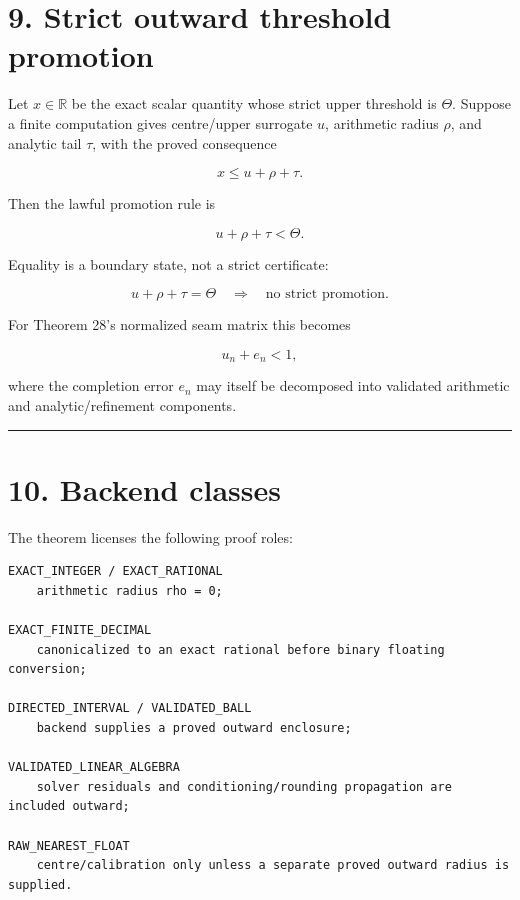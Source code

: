 \hypertarget{strict-outward-threshold-promotion}{%
\section{9. Strict outward threshold promotion}\label{strict-outward-threshold-promotion}}

Let \(x\in\mathbb R\) be the exact scalar quantity whose strict upper threshold
is \(\Theta\). Suppose a finite computation gives centre/upper surrogate \(u\),
arithmetic radius \(\rho\), and analytic tail \(\tau\), with the proved
consequence

\[
x\le u+\rho+\tau.
\tag{9.1}
\]

Then the lawful promotion rule is

\[
\boxed{u+\rho+\tau<\Theta.}
\tag{9.2}
\]

Equality is a boundary state, not a strict certificate:

\[
u+\rho+\tau=\Theta
\quad\Longrightarrow\quad
\text{no strict promotion}.
\tag{9.3}
\]

For Theorem 28's normalized seam matrix this becomes

\[
\boxed{u_n+e_n<1,}
\tag{9.4}
\]

where the completion error \(e_n\) may itself be decomposed into validated
arithmetic and analytic/refinement components.

\begin{center}\rule{0.5\linewidth}{0.5pt}\end{center}

\hypertarget{backend-classes}{%
\section{10. Backend classes}\label{backend-classes}}

The theorem licenses the following proof roles:

\begin{verbatim}
EXACT_INTEGER / EXACT_RATIONAL
    arithmetic radius rho = 0;

EXACT_FINITE_DECIMAL
    canonicalized to an exact rational before binary floating conversion;

DIRECTED_INTERVAL / VALIDATED_BALL
    backend supplies a proved outward enclosure;

VALIDATED_LINEAR_ALGEBRA
    solver residuals and conditioning/rounding propagation are included outward;

RAW_NEAREST_FLOAT
    centre/calibration only unless a separate proved outward radius is supplied.
\end{verbatim}

